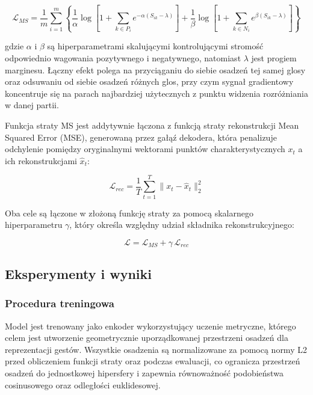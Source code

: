 \begin{equation}
  \mathcal{L}_{MS} = \frac{1}{m}\sum_{i=1}^{m}\left\{
    \frac{1}{\alpha}\log\!\left[1+\sum_{k\in P_i}e^{-\alpha(S_{ik}-\lambda)}\right]
  + \frac{1}{\beta}\log\!\left[1+\sum_{k\in N_i}e^{\beta(S_{ik}-\lambda)}\right]
  \right\}
  \label{eq:ms-loss}
\end{equation}

gdzie $\alpha$ i $\beta$ są hiperparametrami skalującymi kontrolującymi
stromość odpowiednio wagowania pozytywnego i negatywnego, natomiast
$\lambda$ jest progiem marginesu. Łączny efekt polega na przyciąganiu do
siebie osadzeń tej samej glosy oraz odsuwaniu od siebie osadzeń różnych glos,
przy czym sygnał gradientowy koncentruje się na parach najbardziej użytecznych
z punktu widzenia rozróżniania w danej partii.

Funkcja straty MS jest addytywnie łączona z funkcją straty rekonstrukcji
Mean Squared Error (MSE), generowaną przez gałąź dekodera, która penalizuje
odchylenie pomiędzy oryginalnymi wektorami punktów charakterystycznych
$x_t$ a ich rekonstrukcjami $\hat{x}_t$:

\begin{equation}
  \mathcal{L}_{rec} = \frac{1}{T}\sum_{t=1}^{T} \lVert x_t - \hat{x}_t \rVert_2^2
  \label{eq:mse-loss}
\end{equation}

Oba cele są łączone w złożoną funkcję straty za pomocą skalarnego
hiperparametru $\gamma$, który określa względny udział składnika
rekonstrukcyjnego:

\begin{equation}
  \mathcal{L} = \mathcal{L}_{MS} + \gamma\, \mathcal{L}_{rec}
  \label{eq:composite-loss}
\end{equation}

\subsection{Eksperymenty i wyniki}
\label{sec:gloss-recognition-experiments}

\subsubsection{Procedura treningowa}

Model jest trenowany jako enkoder wykorzystujący uczenie metryczne, którego
celem jest utworzenie geometrycznie uporządkowanej przestrzeni osadzeń dla
reprezentacji gestów. Wszystkie osadzenia są normalizowane za pomocą normy L2
przed obliczeniem funkcji straty oraz podczas ewaluacji, co ogranicza przestrzeń
osadzeń do jednostkowej hipersfery i zapewnia równoważność podobieństwa
cosinusowego oraz odległości euklidesowej.

